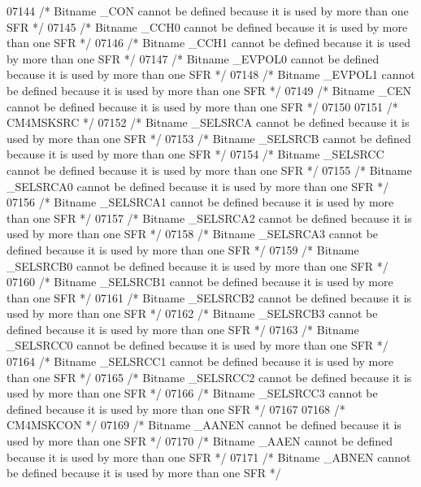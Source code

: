 \begin{DoxyCode}
07144 \textcolor{comment}{/* Bitname \_CON cannot be defined because it is used by more than one SFR */}
07145 \textcolor{comment}{/* Bitname \_CCH0 cannot be defined because it is used by more than one SFR */}
07146 \textcolor{comment}{/* Bitname \_CCH1 cannot be defined because it is used by more than one SFR */}
07147 \textcolor{comment}{/* Bitname \_EVPOL0 cannot be defined because it is used by more than one SFR */}
07148 \textcolor{comment}{/* Bitname \_EVPOL1 cannot be defined because it is used by more than one SFR */}
07149 \textcolor{comment}{/* Bitname \_CEN cannot be defined because it is used by more than one SFR */}
07150 
07151 \textcolor{comment}{/* CM4MSKSRC */}
07152 \textcolor{comment}{/* Bitname \_SELSRCA cannot be defined because it is used by more than one SFR */}
07153 \textcolor{comment}{/* Bitname \_SELSRCB cannot be defined because it is used by more than one SFR */}
07154 \textcolor{comment}{/* Bitname \_SELSRCC cannot be defined because it is used by more than one SFR */}
07155 \textcolor{comment}{/* Bitname \_SELSRCA0 cannot be defined because it is used by more than one SFR */}
07156 \textcolor{comment}{/* Bitname \_SELSRCA1 cannot be defined because it is used by more than one SFR */}
07157 \textcolor{comment}{/* Bitname \_SELSRCA2 cannot be defined because it is used by more than one SFR */}
07158 \textcolor{comment}{/* Bitname \_SELSRCA3 cannot be defined because it is used by more than one SFR */}
07159 \textcolor{comment}{/* Bitname \_SELSRCB0 cannot be defined because it is used by more than one SFR */}
07160 \textcolor{comment}{/* Bitname \_SELSRCB1 cannot be defined because it is used by more than one SFR */}
07161 \textcolor{comment}{/* Bitname \_SELSRCB2 cannot be defined because it is used by more than one SFR */}
07162 \textcolor{comment}{/* Bitname \_SELSRCB3 cannot be defined because it is used by more than one SFR */}
07163 \textcolor{comment}{/* Bitname \_SELSRCC0 cannot be defined because it is used by more than one SFR */}
07164 \textcolor{comment}{/* Bitname \_SELSRCC1 cannot be defined because it is used by more than one SFR */}
07165 \textcolor{comment}{/* Bitname \_SELSRCC2 cannot be defined because it is used by more than one SFR */}
07166 \textcolor{comment}{/* Bitname \_SELSRCC3 cannot be defined because it is used by more than one SFR */}
07167 
07168 \textcolor{comment}{/* CM4MSKCON */}
07169 \textcolor{comment}{/* Bitname \_AANEN cannot be defined because it is used by more than one SFR */}
07170 \textcolor{comment}{/* Bitname \_AAEN cannot be defined because it is used by more than one SFR */}
07171 \textcolor{comment}{/* Bitname \_ABNEN cannot be defined because it is used by more than one SFR */}

\end{DoxyCode}
